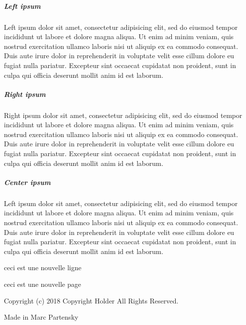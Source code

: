 \documentclass{report}
\begin{document}
\subparagraph{Left ipsum}
\begin{flushleft}
Left ipsum dolor sit amet, consectetur adipisicing elit, sed do eiusmod tempor incididunt ut labore et dolore magna aliqua. Ut enim ad minim veniam, quis nostrud exercitation ullamco laboris nisi ut aliquip ex ea commodo consequat. Duis aute irure dolor in reprehenderit in voluptate velit esse cillum dolore eu fugiat nulla pariatur. Excepteur sint occaecat cupidatat non proident, sunt in culpa qui officia deserunt mollit anim id est laborum.
\end{flushleft}

\subparagraph{Right ipsum}
\begin{flushright}
Right ipsum dolor sit amet, consectetur adipisicing elit, sed do eiusmod tempor incididunt ut labore et dolore magna aliqua. Ut enim ad minim veniam, quis nostrud exercitation ullamco laboris nisi ut aliquip ex ea commodo consequat. Duis aute irure dolor in reprehenderit in voluptate velit esse cillum dolore eu fugiat nulla pariatur. Excepteur sint occaecat cupidatat non proident, sunt in culpa qui officia deserunt mollit anim id est laborum.
\end{flushright}


\subparagraph{Center ipsum}
\begin{center}
Left ipsum dolor sit amet, consectetur adipisicing elit, sed do eiusmod tempor incididunt ut labore et dolore magna aliqua. Ut enim ad minim veniam, quis nostrud exercitation ullamco laboris nisi ut aliquip ex ea commodo consequat. Duis aute irure dolor in reprehenderit in voluptate velit esse cillum dolore eu fugiat nulla pariatur. Excepteur sint occaecat cupidatat non proident, sunt in culpa qui officia deserunt mollit anim id est laborum.
\end{center}

ceci
\newline
est une nouvelle ligne

ceci
\newpage
est une nouvelle page


\appendix
Copyright (c) 2018 Copyright Holder All Rights Reserved.

Made in Marc Partensky
\end{document}
